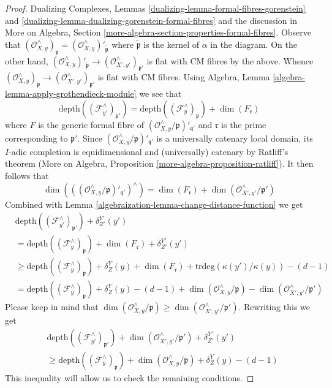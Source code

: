 \begin{proof}
Dualizing Complexes, Lemmas
\ref{dualizing-lemma-formal-fibres-gorenstein} and
\ref{dualizing-lemma-dualizing-gorenstein-formal-fibres}
and the discussion in More on Algebra, Section
\ref{more-algebra-section-properties-formal-fibres}.
Observe that $(\mathcal{O}_{X, y}^\wedge)_\mathfrak p =
(\mathcal{O}_{X, y}^\wedge)'_{\tilde{\mathfrak p}}$
where $\tilde{\mathfrak p}$ is the kernel of $\alpha$
in the diagram. On the other hand,
$(\mathcal{O}_{X, y}^\wedge)'_{\tilde{\mathfrak p}}
\to (\mathcal{O}_{X', y'}^\wedge)_{\mathfrak p'}$
is flat with CM fibres by the above. Whence
$(\mathcal{O}_{X, y}^\wedge)_\mathfrak p  \to
(\mathcal{O}_{X', y'}^\wedge)_{\mathfrak p'}$ is flat with CM fibres.
Using Algebra, Lemma \ref{algebra-lemma-apply-grothendieck-module}
we see that
$$
\text{depth}((\mathcal{F}_{y'}^\wedge)_{\mathfrak p'}) =
\text{depth}((\mathcal{F}_y^\wedge)_{\mathfrak p}) +
\dim(F_\mathfrak r)
$$
where $F$ is the generic formal fibre of
$(\mathcal{O}_{X, y}^\wedge/\mathfrak p)'_{\mathfrak q'}$
and $\mathfrak r$ is the prime corresponding to $\mathfrak p'$.
Since $(\mathcal{O}_{X, y}^\wedge/\mathfrak p)'_{\mathfrak q'}$
is a universally catenary local domain, its $I$-adic completion
is equidimensional and (universally) catenary by Ratliff's theorem
(More on Algebra, Proposition \ref{more-algebra-proposition-ratliff}).
It then follows that
$$
\dim(((\mathcal{O}_{X, y}^\wedge/\mathfrak p)'_{\mathfrak q'})^\wedge) =
\dim(F_\mathfrak r) + \dim(\mathcal{O}_{X', y'}^\wedge/\mathfrak p')
$$
Combined with Lemma \ref{algebraization-lemma-change-distance-function}
we get
\begin{equation}
\label{equation-one}
\begin{aligned}
&
\text{depth}((\mathcal{F}_{y'}^\wedge)_{\mathfrak p'}) +
\delta^{Y'}_{Z'}(y') \\
& =
\text{depth}((\mathcal{F}_y^\wedge)_{\mathfrak p}) +
\dim(F_\mathfrak r) + \delta^{Y'}_{Z'}(y') \\
& \geq
\text{depth}((\mathcal{F}_y^\wedge)_{\mathfrak p}) + \delta^Y_Z(y) +
\dim(F_\mathfrak r) + \text{trdeg}(\kappa(y')/\kappa(y)) - (d - 1) \\
& =
\text{depth}((\mathcal{F}_y^\wedge)_{\mathfrak p}) + \delta^Y_Z(y) - (d - 1)
+ \dim(\mathcal{O}_{X, y}^\wedge/\mathfrak p) -
\dim(\mathcal{O}_{X', y'}^\wedge/\mathfrak p')
\end{aligned}
\end{equation}
Please keep in mind that
$\dim(\mathcal{O}_{X, y}^\wedge/\mathfrak p) \geq
\dim(\mathcal{O}_{X', y'}^\wedge/\mathfrak p')$. Rewriting this we get
\begin{equation}
\label{equation-two}
\begin{aligned}
&
\text{depth}((\mathcal{F}_{y'}^\wedge)_{\mathfrak p'}) +
\dim(\mathcal{O}_{X', y'}^\wedge/\mathfrak p') +
\delta^{Y'}_{Z'}(y') \\
& \geq
\text{depth}((\mathcal{F}_y^\wedge)_{\mathfrak p}) +
\dim(\mathcal{O}_{X, y}^\wedge/\mathfrak p) +
\delta^Y_Z(y) - (d - 1)
\end{aligned}
\end{equation}
This inequality will allow us to check the remaining conditions.


\end{proof}
